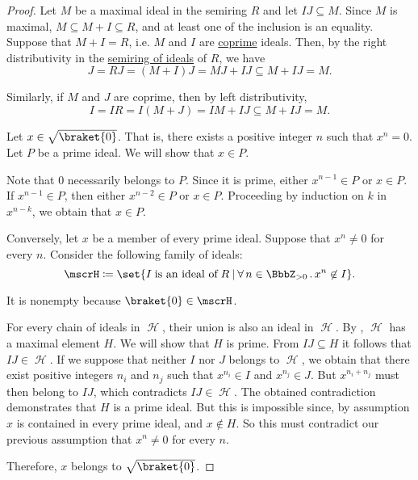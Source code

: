 \begin{proof}
   Let \( M \) be a maximal ideal in the semiring \( R \) and let \( IJ \subseteq M \). Since \( M \) is maximal, \( M \subseteq M + I \subseteq R \), and at least one of the inclusion is an equality. Suppose that \( M + I = R \), i.e. \( M \) and \( I \) are \hyperref[def:derived_semiring_ideals/coprime]{coprime} ideals. Then, by the right distributivity in the \hyperref[thm:semiring_of_ideals/lattice]{semiring of ideals} of \( R \), we have
  \begin{equation*}
    J = RJ = (M + I)J = MJ + IJ \subseteq M + IJ = M.
  \end{equation*}

  Similarly, if \( M \) and \( J \) are coprime, then by left distributivity,
  \begin{equation*}
    I = IR = I(M + J) = IM + IJ \subseteq M + IJ = M.
  \end{equation*}

  \SufficiencySubProof* Let \( x \in \sqrt{\braket{0}} \). That is, there exists a positive integer \( n \) such that \( x^n = 0 \). Let \( P \) be a prime ideal. We will show that \( x \in P \).

  Note that \( 0 \) necessarily belongs to \( P \). Since it is prime, either \( x^{n-1} \in P \) or \( x \in P \). If \( x^{n-1} \in P \), then either \( x^{n-2} \in P \) or \( x \in P \). Proceeding by induction on \( k \) in \( x^{n-k} \), we obtain that \( x \in P \).

  \NecessitySubProof* Conversely, let \( x \) be a member of every prime ideal. Suppose that \( x^n \neq 0 \) for every \( n \). Consider the following family of ideals:
  \begin{equation*}
    \mscrH \coloneqq \set{ I \T{is an ideal of} R \given \qforall {n \in \BbbZ_{>0}} x^n \not\in I }.
  \end{equation*}

  It is nonempty because \( \braket{0} \in \mscrH \).

  For every chain of ideals in \( \mscrH \), their union is also an ideal in \( \mscrH \). By , \( \mscrH \) has a maximal element \( H \). We will show that \( H \) is prime. From \( IJ \subseteq H \) it follows that \( IJ \in \mscrH \). If we suppose that neither \( I \) nor \( J \) belongs to \( \mscrH \), we obtain that there exist positive integers \( n_i \) and \( n_j \) such that \( x^{n_i} \in I \) and \( x^{n_j} \in J \). But \( x^{n_i + n_j} \) must then belong to \( IJ \), which contradicts \( IJ \in \mscrH \). The obtained contradiction demonstrates that \( H \) is a prime ideal. But this is impossible since, by assumption \( x \) is contained in every prime ideal, and \( x \not\in H \). So this must contradict our previous assumption that \( x^n \neq 0 \) for every \( n \).

  Therefore, \( x \) belongs to \( \sqrt{\braket{0}} \).
\end{proof}

